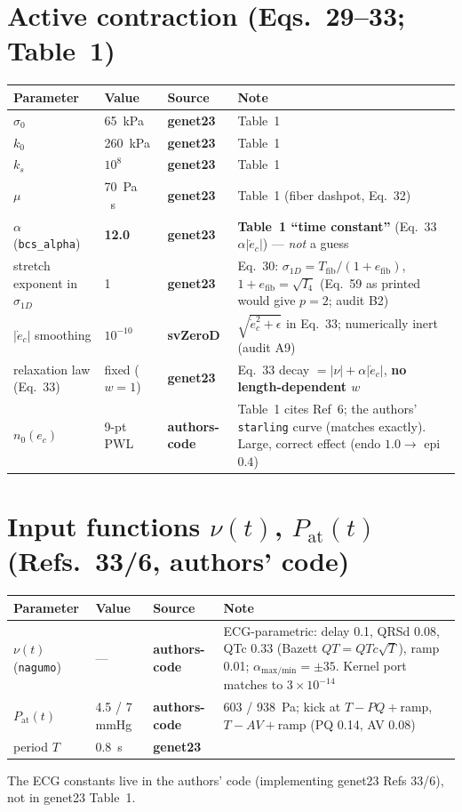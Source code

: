 \documentclass[10pt]{article}
\newcommand{\gen}{\textcolor{cgen}{\textbf{genet23}}}
\newcommand{\code}{\textcolor{ccode}{\textbf{authors-code}}}
\newcommand{\svz}{\textcolor{csvz}{\textbf{svZeroD}}}
\begin{document}
\section*{Active contraction (Eqs.~29--33; Table~1)}
\begin{longtable}{l l l P{6.6cm}}
\toprule Parameter & Value & Source & Note \\ \midrule\endhead
$\sigma_0$ & \SI{65}{kPa} & \gen & Table~1 \\
$k_0$      & \SI{260}{kPa} & \gen & Table~1 \\
$k_s$      & $10^8$ & \gen & Table~1 \\
$\mu$      & \SI{70}{Pa\,s} & \gen & Table~1 (fiber dashpot, Eq.~32) \\
$\alpha$ (\texttt{bcs\_alpha}) & \textbf{12.0} & \gen & \textbf{Table~1 ``time constant''} (Eq.~33 $\alpha|\dot e_c|$) --- \emph{not} a guess \\
stretch exponent in $\sigma_{1D}$ & 1 & \gen & Eq.~30: $\sigma_{1D}=T_\text{fib}/(1{+}e_\text{fib})$, $1{+}e_\text{fib}=\sqrt{I_4}$ (Eq.~59 as printed would give $p{=}2$; audit B2) \\
$|\dot e_c|$ smoothing & $10^{-10}$ & \svz & $\sqrt{\dot e_c^2+\epsilon}$ in Eq.~33; numerically inert (audit A9) \\
relaxation law (Eq.~33) & fixed ($w{=}1$) & \gen & Eq.~33 decay $=|\nu|+\alpha|\dot e_c|$, \textbf{no length-dependent $w$} \\
$n_0(e_c)$ & 9-pt PWL & \code & Table~1 cites Ref~6; the authors' \texttt{starling} curve (matches exactly). Large, correct effect (endo $1.0\to$ epi $0.4$) \\
\bottomrule
\end{longtable}

\section*{Input functions $\nu(t)$, $P_\text{at}(t)$ (Refs.~33/6, authors' code)}
\begin{longtable}{l l l P{6.6cm}}
\toprule Parameter & Value & Source & Note \\ \midrule\endhead
$\nu(t)$ (\texttt{nagumo}) & --- & \code & ECG-parametric: delay 0.1, QRSd 0.08, QTc 0.33 (Bazett $QT{=}QTc\sqrt{T}$), ramp 0.01; $\alpha_\text{max/min}{=}\pm35$. Kernel port matches to $3\times10^{-14}$ \\
$P_\text{at}(t)$ & 4.5 / 7 mmHg & \code & 603 / \SI{938}{Pa}; kick at $T{-}PQ{+}$ramp, $T{-}AV{+}$ramp (PQ 0.14, AV 0.08) \\
period $T$ & \SI{0.8}{s} & \gen & \\
\bottomrule
\end{longtable}
\noindent\footnotesize The ECG constants live in the authors' code (implementing genet23 Refs 33/6), not in genet23 Table~1. \normalsize
\end{document}
